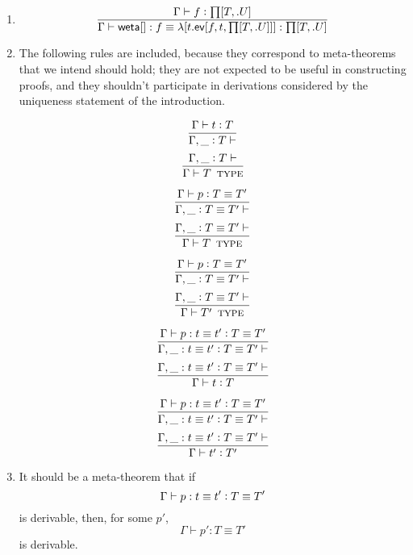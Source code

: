 \documentclass[11pt]{article}
\newcommand{\eqd}{\equiv}
\newcommand{\ccolon}{\vcentcolon}
\newcommand{\ccheck}{\vcentcolon}            %
\newcommand{\TYPE}{\mathop{\text{ \sc type}}}
\newcommand{\Okay}{\mathop{\text{ \sc okay}}}
\newcommand{\Context}{\vdash\Okay}
\renewcommand{\Context}{\vdash}
\newcommand{\ha}[2]{#1[#2]}
\newcommand{\weta}{{\sf weta}}
\newcommand{\ev}{{\sf ev}}
\newcommand{\var}{\char`_}
\begin{document}
\begin{enumerate}
\item 
\[
  \frac{\Gamma \vdash f \ccheck{\ha\prod{T,.U}}}
       {\Gamma \vdash \ha\weta{} : f \eqd \ha\lambda{t.\ha\ev{f,t,{\ha\prod{T,.U}}}} : \ha\prod{T,.U}
       }
\]

\item
The following rules are included, because they correspond to meta-theorems that
we intend should hold; they are not expected to be useful in constructing
proofs, and they shouldn't participate in derivations considered by the
uniqueness statement of the introduction.

\[
  \frac{\Gamma \vdash t \ccolon T}
       {\Gamma, \var \ccolon T \Context}
\]
\[
  \frac{\Gamma, \var \ccolon T \Context}
       {\Gamma \vdash T \TYPE}
\]

\[
  \frac{\Gamma \vdash p \ccolon T \eqd T'}
       {\Gamma, \var \ccolon T \eqd T' \Context}
\]
\[
  \frac{\Gamma, \var \ccolon T \eqd T' \Context}
       {\Gamma \vdash T \TYPE}
\]

\[
  \frac{\Gamma \vdash p \ccolon T \eqd T'}
       {\Gamma, \var \ccolon T \eqd T' \Context}
\]
\[
  \frac{\Gamma, \var \ccolon T \eqd T' \Context}
       {\Gamma \vdash T' \TYPE}
\]

\[
  \frac{\Gamma \vdash p : t \eqd t' \ccolon T \eqd T'}
       {\Gamma, \var : t \eqd t' \ccolon T \eqd T' \Context}
\]
\[
  \frac{\Gamma, \var : t \eqd t' \ccolon T \eqd T' \Context}
       {\Gamma \vdash t \ccolon T}
\]

\[
  \frac{\Gamma \vdash p : t \eqd t' \ccolon T \eqd T'}
       {\Gamma, \var : t \eqd t' \ccolon T \eqd T' \Context}
\]
\[
  \frac{\Gamma, \var : t \eqd t' \ccolon T \eqd T' \Context}
       {\Gamma \vdash t' \ccolon T'}
\]

\item
It should be a meta-theorem that if
\[{\Gamma \vdash p : t \eqd t' \ccolon T \eqd T'}\]
is derivable, then, for some $p'$,
\[{\Gamma \vdash p' : T \eqd T'}\]
is derivable.

\end{enumerate}



\end{document}
